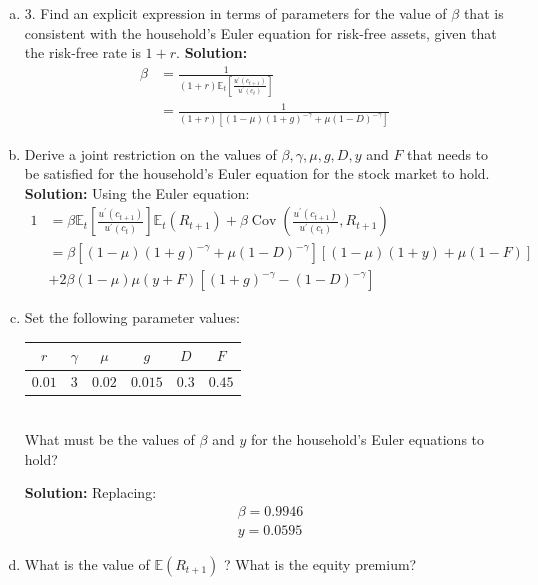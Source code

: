 \documentclass[11pt]{extarticle}
\theoremstyle{plain}
\theoremstyle{definition}
\begin{document}
\begin{enumerate}[(a)]
\item 3. Find an explicit expression in terms of parameters for the value of $\beta$ that is consistent with
the household’s Euler equation for risk-free assets, given that the risk-free rate is $1 + r$.
\textbf{Solution:}
 $$
\begin{aligned}
\beta &=\frac{1}{(1+r) \mathbb{E}_t\left[\frac{u^{\prime}\left(c_{t+1}\right)}{u^{\prime}\left(c_t\right)}\right]} \\
&=\frac{1}{(1+r)\left[(1-\mu)(1+g)^{-\gamma}+\mu(1-D)^{-\gamma}\right]}
\end{aligned}
$$

\item Derive a joint restriction on the values of $\beta, \gamma, \mu, g, D, y$ and $F$ that needs to be satisfied for the household's Euler equation for the stock market to hold.
\textbf{Solution:} 
Using the Euler equation:
$$
\begin{aligned}
1 &=\beta \mathbb{E}_t\left[\frac{u^{\prime}\left(c_{t+1}\right)}{u^{\prime}\left(c_t\right)}\right] \mathbb{E}_t\left(R_{t+1}\right)+\beta \operatorname{Cov}\left(\frac{u^{\prime}\left(c_{t+1}\right)}{u^{\prime}\left(c_t\right)}, R_{t+1}\right) \\
&=\beta\left[(1-\mu)(1+g)^{-\gamma}+\mu(1-D)^{-\gamma}\right][(1-\mu)(1+y)+\mu(1-F)] \\
&+2 \beta(1-\mu) \mu(y+F)\left[(1+g)^{-\gamma}-(1-D)^{-\gamma}\right]
\end{aligned}
$$

\item Set the following parameter values: \\

\begin{tabular}{|c|c|c|c|c|c|}
\hline$r$ & $\gamma$ & $\mu$ & $g$ & $D$ & $F$ \\
\hline $0.01$ & 3 & $0.02$ & $0.015$ & $0.3$ & $0.45$ \\
\hline
\end{tabular}\\

What must be the values of $\beta$ and $y$ for the household's Euler equations to hold?

\textbf{Solution:}
Replacing:
$$
\begin{aligned}
&\beta=0.9946 \\
&y=0.0595
\end{aligned}
$$

\item What is the value of $\mathbb{E}\left(R_{t+1}\right)$ ? What is the equity premium?


\end{enumerate}
\end{document}
